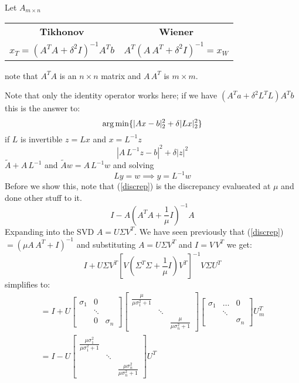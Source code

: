 Let $A_{m\times n}$
\begin{center}
\begin{tabular}{cc}
\textbf{Tikhonov} & \textbf{Wiener} \\
$x_T = (A^TA + \delta^2 I )^{-1} A^T b$ & $A^T(A\, A^T + \delta^2 I)^{-1} = x_W$\end{tabular}
\end{center}
note that $A^T A$ is an $n\times n$ matrix and $A\, A^T$ is $m\times m$.

Note that only the identity operator works here; if we have $(A^T a + \delta^2 L^T L)A^T b$ this is the answer to:
$$\operatorname*{arg\,min} \{ |Ax-b|^2_2 + \delta |Lx|^2_2 \}$$
if $L$ is invertible  $z=L x$ and $x=L^{-1}z$
$$|A\, L^{-1} z - b |^2 + \delta |z|^2$$
$\tilde A + A\, L^{-1}$  and $\tilde A w = A\, L^{-1} w$ and solving
$$Ly=w \implies y=L^{-1}w$$
Before we show this, note that (\ref{discrep}) is the discrepancy evalueated at $\mu$ and done other stuff to it.
\begin{equation} \label{discrep}
I - A(A^T A + \frac 1\mu I)^{-1} A
\end{equation}
Expanding into the SVD $A= U\Sigma V^T$. We have seen previously that (\ref{discrep})$=(\mu A\, A^T + I )^{-1}$ and substituting $A = U\Sigma V^T$ and $I=V\,V^T$ we get: 
$$I+ U\Sigma V^T \left[ V(\Sigma^T \Sigma + \frac 1\mu I)V^T \right]^{-1} V\Sigma U^T $$
simplifies to:
\begin{gather*}
= I + U\begin{bmatrix} \sigma_1 & 0 & \\ & \ddots & \\ & 0 & \sigma_n \end{bmatrix} \begin{bmatrix} \frac{\mu}{\mu \sigma_1^2 + 1} & & \\ & \ddots & \\ & & \frac{\mu}{\mu \sigma_n^2 + 1} \end{bmatrix} \begin{bmatrix} \sigma_1 & \ldots & 0\\ & \ddots & \\ & & \sigma_n \end{bmatrix} U_m^T \\
= I - U \begin{bmatrix} \frac{\mu \sigma_1^2}{\mu \sigma_1^2 + 1} & & \\ & \ddots & \\ & & \frac{\mu \sigma_n^2}{\mu \sigma_n^2 + 1} \end{bmatrix} U^T
\end{gather*}
